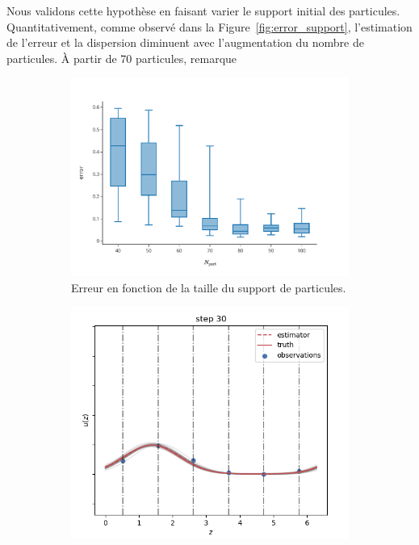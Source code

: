 Nous validons cette hypothèse en faisant varier le support initial des particules. Quantitativement, comme observé dans la Figure~\ref{fig:error_support}, l'estimation de l'erreur et la dispersion diminuent avec l'augmentation du nombre de particules. À partir de 70 particules, remarque
\begin{figure}
    \centering
    \begin{subfigure}{0.39\textwidth}
        \includegraphics[width=\textwidth]{images/app1d/error_support/error_part.pdf}
        \caption{Erreur en fonction de la taille du support de particules.}
        \label{fig:error_support1}
    \end{subfigure}
    \hfill
    \begin{subfigure}{0.29\textwidth}
        \includegraphics[width=\textwidth]{images/app1d/error_support/ok.png}

\end{subfigure}
\end{figure}
